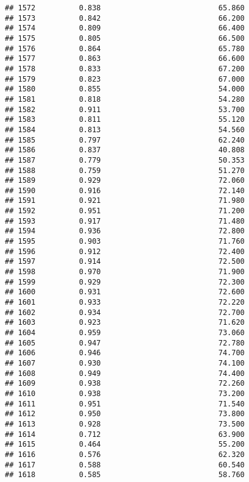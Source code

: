 \documentclass[
]{article}
\begin{document}
\begin{verbatim}
## 1572          0.838                           65.860
## 1573          0.842                           66.200
## 1574          0.809                           66.400
## 1575          0.805                           66.500
## 1576          0.864                           65.780
## 1577          0.863                           66.600
## 1578          0.833                           67.200
## 1579          0.823                           67.000
## 1580          0.855                           54.000
## 1581          0.818                           54.280
## 1582          0.911                           53.700
## 1583          0.811                           55.120
## 1584          0.813                           54.560
## 1585          0.797                           62.240
## 1586          0.837                           40.808
## 1587          0.779                           50.353
## 1588          0.759                           51.270
## 1589          0.929                           72.060
## 1590          0.916                           72.140
## 1591          0.921                           71.980
## 1592          0.951                           71.200
## 1593          0.917                           71.480
## 1594          0.936                           72.800
## 1595          0.903                           71.760
## 1596          0.912                           72.400
## 1597          0.914                           72.500
## 1598          0.970                           71.900
## 1599          0.929                           72.300
## 1600          0.931                           72.600
## 1601          0.933                           72.220
## 1602          0.934                           72.700
## 1603          0.923                           71.620
## 1604          0.959                           73.060
## 1605          0.947                           72.780
## 1606          0.946                           74.700
## 1607          0.930                           74.100
## 1608          0.949                           74.400
## 1609          0.938                           72.260
## 1610          0.938                           73.200
## 1611          0.951                           71.540
## 1612          0.950                           73.800
## 1613          0.928                           73.500
## 1614          0.712                           63.900
## 1615          0.464                           55.200
## 1616          0.576                           62.320
## 1617          0.588                           60.540
## 1618          0.585                           58.760

\end{verbatim}
\end{document}
